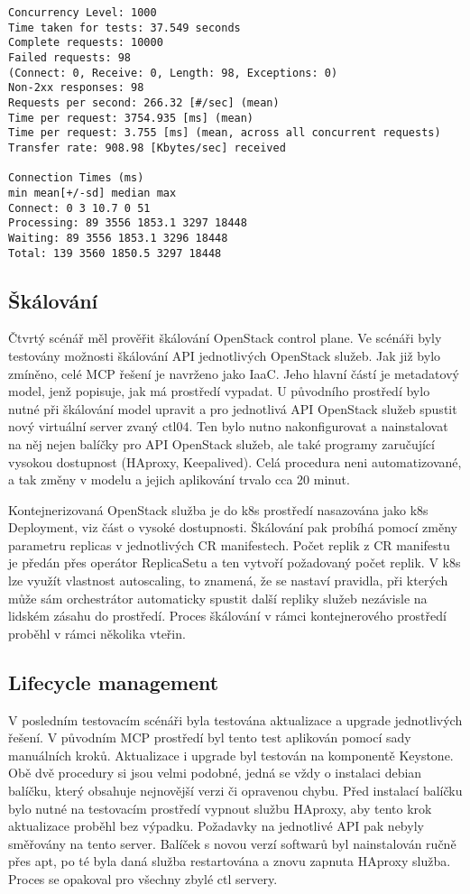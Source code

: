 \begin{lstlisting}[caption={Ukázka benchmark testu pro sto tisíc dotazů, zdroj: vlastní tvorba},label={lst:testreq}]
Concurrency Level: 1000
Time taken for tests: 37.549 seconds
Complete requests: 10000
Failed requests: 98
(Connect: 0, Receive: 0, Length: 98, Exceptions: 0)
Non-2xx responses: 98
Requests per second: 266.32 [#/sec] (mean)
Time per request: 3754.935 [ms] (mean)
Time per request: 3.755 [ms] (mean, across all concurrent requests)
Transfer rate: 908.98 [Kbytes/sec] received

Connection Times (ms)
min mean[+/-sd] median max
Connect: 0 3 10.7 0 51
Processing: 89 3556 1853.1 3297 18448
Waiting: 89 3556 1853.1 3296 18448
Total: 139 3560 1850.5 3297 18448
\end{lstlisting}

\subsection{Škálování}
Čtvrtý scénář měl prověřit škálování OpenStack control plane. Ve scénáři byly testovány možnosti škálování API jednotlivých OpenStack služeb. Jak již bylo zmíněno, celé MCP řešení je navrženo jako IaaC. Jeho hlavní částí je metadatový model, jenž popisuje, jak má prostředí vypadat. U původního prostředí bylo nutné při škálování model upravit a pro jednotlivá API OpenStack služeb spustit nový virtuální server zvaný ctl04. Ten bylo nutno nakonfigurovat a nainstalovat na něj nejen balíčky pro API OpenStack služeb, ale také programy zaručující vysokou dostupnost (HAproxy, Keepalived). Celá procedura neni automatizované, a tak změny v modelu a jejich aplikování trvalo cca 20 minut.

Kontejnerizovaná OpenStack služba je do k8s prostředí nasazována jako k8s Deployment, viz část o vysoké dostupnosti. Škálování pak probíhá pomocí změny parametru replicas v jednotlivých CR manifestech. Počet replik z CR manifestu je předán přes operátor ReplicaSetu a ten vytvoří požadovaný počet replik. V k8s lze využít vlastnost autoscaling, to znamená, že se nastaví pravidla, při kterých může sám orchestrátor automaticky spustit další repliky služeb nezávisle na lidském zásahu do prostředí. Proces škálování v rámci kontejnerového prostředí proběhl v rámci několika vteřin.

\subsection{Lifecycle management}
V posledním testovacím scénáři byla testována aktualizace a upgrade jednotlivých řešení. V původním MCP prostředí byl tento test aplikován pomocí sady manuálních kroků. Aktualizace i upgrade byl testován na komponentě Keystone. Obě dvě procedury si jsou velmi podobné, jedná se vždy o instalaci debian balíčku, který obsahuje nejnovější verzi či opravenou chybu. Před instalací balíčku bylo nutné na testovacím prostředí vypnout službu HAproxy, aby tento krok aktualizace proběhl bez výpadku. Požadavky na jednotlivé API pak nebyly směřovány na tento server. Balíček s novou verzí softwarů byl nainstalován ručně přes apt, po té byla daná služba restartována a znovu zapnuta HAproxy služba. Proces se opakoval pro všechny zbylé ctl servery.

